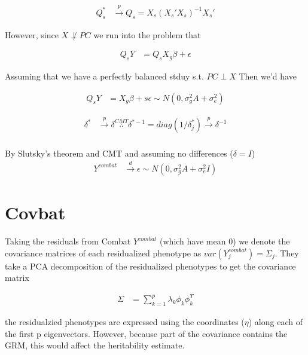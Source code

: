 \documentclass[10pt,a4paper]{article}
\begin{document}
\begin{align*}
	Q_s^* & \stackrel{p}{\to} Q_s = X_s(X_s'X_s)^{-1}X_s'
\end{align*}

However, since $X \not \perp PC$ we run into the problem that 

\begin{align*}
	Q_sY & = Q_sX_g\beta + \epsilon
\end{align*}

Assuming that we have a perfectly balanced stduy s.t. $PC\perp X$ Then we'd have 

\begin{align*}
	Q_sY & = X_g\beta +s \epsilon \sim N(0, \sigma_g^2 A + \sigma_e^2)
\end{align*}

\begin{align*}
	\delta^* & \stackrel{p}{\to} \delta \stackrel{CMT}{\therefore} \delta^{*-1} = diag(1/\delta_j^*) \stackrel{p}{\to} \delta^{-1} \\
\end{align*}

By Slutsky's theorem and CMT and assuming no differences ($\delta = I$)\\

\begin{align*}
	Y^{combat} & \stackrel{d}{\to} \epsilon \sim N(0, \sigma_g^2A + \sigma_e^2I)
\end{align*}


\section{Covbat} 
Taking the residuals from Combat $Y^{combat}$ (which have mean 0)  we denote the covariance matrices of each residualized phenotype as $var(Y^{combat}_j) = \Sigma_j$. They take a PCA decomposition of the residualized phenotypes to get the covariance matrix 

\begin{align*}
	\Sigma & = \sum_{k=1}^p \lambda_k \phi_k\phi_k^T
\end{align*}

the residualzied phenotypes are expressed using the coordinates ($\eta$) along each of the first  p eigenvectors. However, because part of the covariance contains the GRM, this would affect the heritability estimate.
\end{document}

